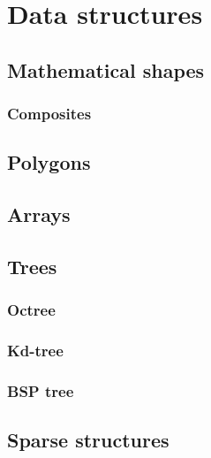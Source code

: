 \section{Data structures}

\subsection{Mathematical shapes}

\subsubsection{Composites}

\subsection{Polygons}

\subsection{Arrays}

\subsection{Trees}

\subsubsection{Octree}

\subsubsection{Kd-tree}

\subsubsection{BSP tree}

\subsection{Sparse structures}